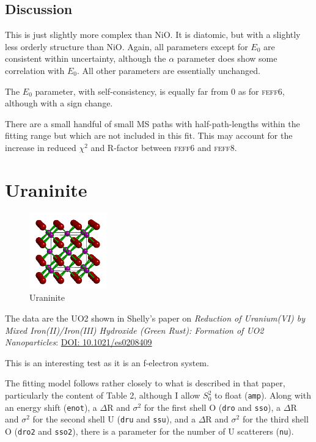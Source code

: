 \documentclass[11pt]{article}
\begin{document}
\subsection{Discussion}
\label{sec:orgheadline18}

This is just slightly more complex than NiO. It is diatomic, but with
a slightly less orderly structure than NiO. Again, all parameters
except for $E_0$ are consistent within uncertainty, although the $\alpha$
parameter does show some correlation with $E_0$. All other parameters are
essentially unchanged.

The $E_0$ parameter, with self-consistency, is equally far from 0 as for
\textsc{feff6}, although with a sign change.

There are a small handful of small MS paths with half-path-lengths
within the fitting range but which are not included in this fit. This
may account for the increase in reduced $\chi^2$ and R-factor between
\textsc{feff6} and \textsc{feff8}.


\section{Uraninite}
\label{sec:orgheadline25}

\begin{figure}
  \begin{center}
    \includegraphics[width=0.3\textwidth]{UO2/UO2.png}
  \end{center}
  \caption{Uraninite}
\end{figure}


The data are the UO2 shown in Shelly's paper on \textit{Reduction of
  Uranium(VI) by Mixed Iron(II)/Iron(III) Hydroxide (Green Rust):
  Formation of UO2 Nanoparticles}:
\href{http://dx.doi.org/10.1021/es0208409}{DOI: 10.1021/es0208409}

This is an interesting test as it is an f-electron system.

The fitting model follows rather closely to what is described in that
paper, particularly the content of Table 2, although I allow $S_0^2$
to float (\texttt{amp}). Along with an energy shift (\texttt{enot}), a
$\Delta$R and $\sigma^2$ for the first shell O (\texttt{dro} and
\texttt{sso}), a $\Delta$R and $\sigma^2$ for the second shell U
(\texttt{dru} and \texttt{ssu}), and a $\Delta$R and $\sigma^2$ for
the third shell O (\texttt{dro2} and \texttt{sso2}), there is a
parameter for the number of U scatterers (\texttt{nu}).
\end{document}
